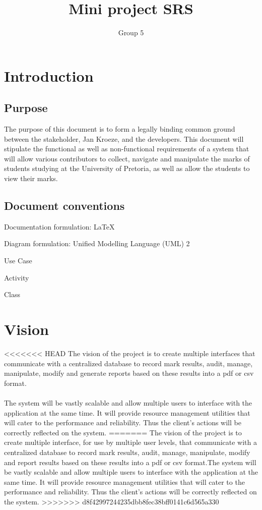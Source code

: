 \documentclass[10pt,a4paper]{article}
\author{Group 5}
\title{Mini project SRS}
\begin{document}
\tableofcontents
\pagebreak
\section{Introduction}

\subsection{Purpose}
The purpose of this document is to form a legally binding common ground between the stakeholder, Jan Kroeze, and the developers. This document will stipulate the functional as well as non-functional requirements of a system that will allow various contributors to collect, navigate and manipulate the marks of students studying at the University of Pretoria, as well as allow the students to view their marks.

\subsection{Document conventions}
\begin{description}
\item Documentation formulation: LaTeX
\item Diagram formulation: Unified Modelling Language (UML) 2
	\item Use Case
	\item Activity
	\item Class
\end{description}

\section{Vision}
<<<<<<< HEAD
The vision of the project is to create multiple interfaces that communicate with a centralized database to record mark results, audit, manage, manipulate, modify and generate reports based on these results into a pdf or csv format.\\\\The system will be vastly scalable and allow multiple users to interface with the application at the same time. It will provide resource management utilities that will cater to the performance and reliability. Thus the client’s actions will be correctly reflected on the system.
=======
The vision of the project is to create multiple interface, for use by multiple user levels, that communicate with a centralized database to record mark results, audit, manage, manipulate, modify and report results based on these results into a pdf or csv format.\linebreak The system will be vastly scalable and allow multiple users to interface with the application at the same time. It will provide resource management utilities that will cater to the performance and reliability. Thus the client’s actions will be correctly reflected on the system.
>>>>>>> d8f42997244235dbb8fec38bff0141c6d565a330
\end{document}
